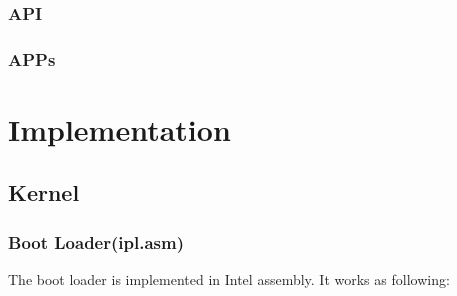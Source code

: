 \documentclass{swfcthesis}
\begin{document}
\subsection{API}
\label{sec:api}

\subsection{APPs}
\label{sec:apps-1}



\chapter{Implementation}

\section{Kernel}
\subsection{Boot Loader(ipl.asm)}

The boot loader is implemented in Intel assembly. It works as following:
\end{document}
